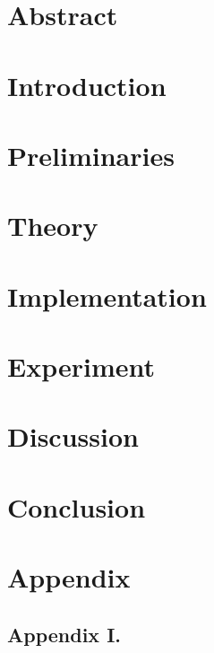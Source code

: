 \documentclass[twoside,12pt,a4paper]{article}
\begin{document}
\clearpage
\maketitle
\vspace{-5.5em}
\begingroup
\fontsize{9pt}{11pt}\selectfont
\tableofcontents
\endgroup
\clearpage
{}

\section{Abstract}

\section{Introduction}
\citep{RailExecutive14a}
\section{Preliminaries}

\section{Theory}

\section{Implementation}

\section{Experiment}

\section{Discussion}

\section{Conclusion}

\clearpage
\lhead{}\rhead{}
{}



\clearpage

\section{Appendix}
\subsection{Appendix I.}
\end{document}
